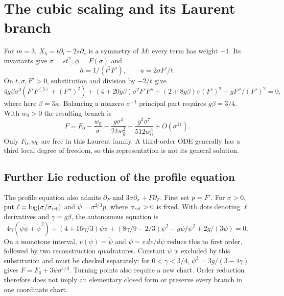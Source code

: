 \documentclass[12pt,a4paper,oneside]{report}
\numberwithin{equation}{chapter}
\theoremstyle{remark}\newtheorem{remark}[theorem]{Remark}
\begin{document}
\section{The cubic scaling and its Laurent branch}
For $m=3$, $X_5=t\partial_t-2s\partial_s$ is a symmetry of $M$: every term has weight $-1$. Its invariants give $\sigma=st^2$, $\phi=F(\sigma)$ and
\[
 h=1/(t^2F'),\qquad u=2\sigma F'/t.
\]
On $t,\sigma,F'>0$, substitution and division by $-2/t$ give
\begin{equation}\label{eq:rev8-x5}
 4g\beta\sigma^3(F'F^{(3)}+(F'')^2)
 +(4+20g\beta)\sigma^2F'F''
 +(2+8g\beta)\sigma(F')^2-gF''/(F')^2=0,
\end{equation}
where here $\beta=3\kappa$. Balancing a nonzero $\sigma^{-1}$ principal part requires $g\beta=3/4$. With $w_0>0$ the resulting branch is
\[
 F=F_0-\frac{w_0}{\sigma}-\frac{g\sigma^3}{24w_0^2}
 -\frac{g^2\sigma^7}{512w_0^5}+O(\sigma^{11}).
\]
Only $F_0,w_0$ are free in this Laurent family. A third-order ODE generally has a third local degree of freedom, so this representation is not its general solution.

\subsection{Further Lie reduction of the profile equation}
The profile equation also admits $\partial_F$ and $3\sigma\partial_\sigma+F\partial_F$. First set $p=F'$. For $\sigma>0$, put $\ell=\log(\sigma/\sigma_{\rm ref})$ and $\psi=\sigma^{2/3}p$, where $\sigma_{\rm ref}>0$ is fixed. With dots denoting $\ell$ derivatives and $\gamma=g\beta$, the autonomous equation is
\[
 4\gamma(\psi\ddot\psi+\dot\psi^2)
 +(4+16\gamma/3)\psi\dot\psi
 +(8\gamma/9-2/3)\psi^2
 -g\dot\psi/\psi^2+2g/(3\psi)=0.
\]
On a monotone interval, $v(\psi)=\dot\psi$ and $\ddot\psi=v\,dv/d\psi$ reduce this to first order, followed by two reconstruction quadratures. Constant $\psi$ is excluded by this substitution and must be checked separately: for $0<\gamma<3/4$, $\psi^3=3g/(3-4\gamma)$ gives $F=F_0+3\psi\sigma^{1/3}$. Turning points also require a new chart. Order reduction therefore does not imply an elementary closed form or preserve every branch in one coordinate chart.
\end{document}
